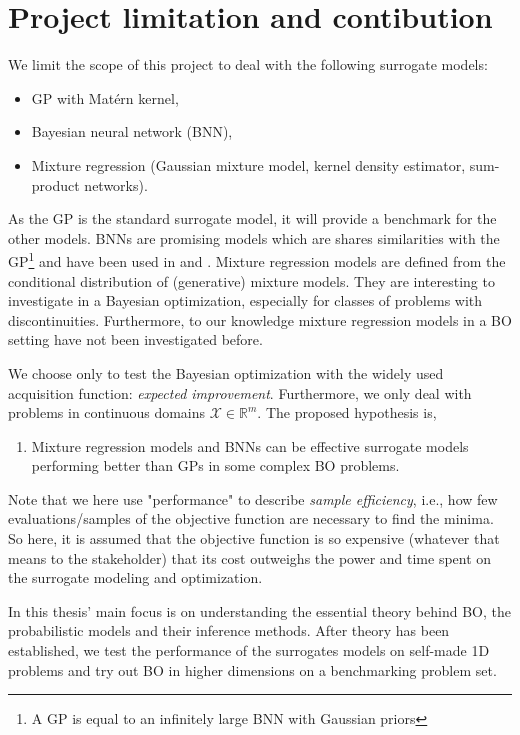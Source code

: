  \section{Project limitation and contibution}
We limit the scope of this project to deal with the following surrogate models:
\begin{itemize}[noitemsep]
    \item GP with Matérn kernel,
    \item Bayesian neural network (BNN),
    \item Mixture regression (Gaussian mixture model, kernel density estimator, sum-product networks).
\end{itemize}
As the GP is the standard surrogate model, it will provide a benchmark for the other models. BNNs
are promising models which are shares similarities with the GP\footnote{A GP is equal to an
infinitely large BNN with Gaussian priors} and have been used in \cite{PhDthesis} and
\cite{BOHAMIANN}. Mixture regression models are defined from the conditional distribution of
(generative) mixture models. They are interesting to investigate in a Bayesian optimization,
especially for classes of problems with discontinuities. Furthermore, to our knowledge mixture
regression models in a BO setting have not been investigated before. 

We choose only to test the Bayesian optimization with the widely used acquisition function:
\textit{expected improvement}. Furthermore, we only deal with problems in continuous domains
$\mathcal{X} \in \mathbb{R}^m$. The proposed hypothesis is,

\begin{enumerate}[noitemsep]
    \item Mixture regression models and BNNs can be effective surrogate models
    performing better than GPs in some complex BO problems. 
\end{enumerate}

Note that we here use "performance" to describe \textit{sample efficiency}, i.e., how few evaluations/samples
of the objective function are necessary to find the minima. So here, it is assumed that the objective
function is so expensive (whatever that means to the stakeholder) that its cost outweighs the power
and time spent on the surrogate modeling and optimization.

In this thesis' main focus is on understanding the essential theory behind BO, the probabilistic
models and their inference methods. After theory has been established, we test the performance of the
surrogates models on self-made 1D problems and try out BO in higher dimensions on a benchmarking
problem set. 


